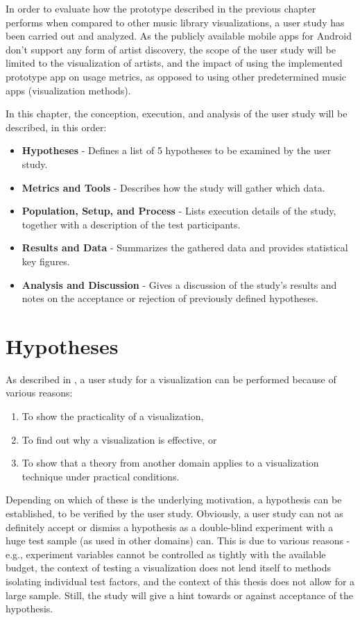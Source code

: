 In order to evaluate how the prototype described in the previous chapter performs when compared to other music library visualizations, a user study has been carried out and analyzed. As the publicly available mobile apps for Android don't support any form of artist discovery, the scope of the user study will be limited to the visualization of artists, and the impact of using the implemented prototype app on usage metrics, as opposed to using other predetermined music apps (visualization methods).

In this chapter, the conception, execution, and analysis of the user study will be described, in this order:

\begin{itemize}
	\item \textbf {Hypotheses} - Defines a list of 5 hypotheses to be examined by the user study.
	\item \textbf {Metrics and Tools} - Describes how the study will gather which data.
	\item \textbf {Population, Setup, and Process} - Lists execution details of the study, together with a description of the test participants.
	\item \textbf {Results and Data} - Summarizes the gathered data and provides statistical key figures.
	\item \textbf {Analysis and Discussion} - Gives a discussion of the study's results and notes on the acceptance or rejection of previously defined hypotheses.
\end{itemize}

\section{Hypotheses}

As described in \cite{Christopher03thoughtson}, a user study for a visualization can be performed because of various reasons: 

\begin{enumerate}
	\item To show the practicality of a visualization,
	\item To find out why a visualization is effective, or
	\item To show that a theory from another domain applies to a visualization technique under practical conditions.
\end{enumerate}
	
Depending on which of these is the underlying motivation, a hypothesis can be established, to be verified by the user study. Obviously, a user study can not as definitely accept or dismiss a hypothesis as a double-blind experiment with a huge test sample (as used in other domains) can. This is due to various reasons - e.g., experiment variables cannot be controlled as tightly with the available budget, the context of testing a visualization does not lend itself to methods isolating individual test factors, and the context of this thesis does not allow for a large sample. Still, the study will give a hint towards or against acceptance of the hypothesis.

